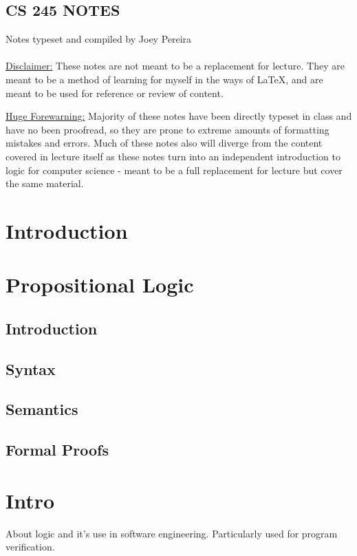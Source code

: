 \documentclass[12pt,oneside,fleqn]{article}
\theoremstyle{definition}
\begin{document}
\thispagestyle{empty}
\subsection*{CS 245 NOTES}
Notes typeset and compiled by Joey Pereira \\
\vspace{1in}
\\
\underline{Disclaimer:}
These notes are not meant to be a replacement for lecture. They are meant to be a method of learning for myself in the ways of \LaTeX, and are meant to be used for reference or review of content.

\underline{Huge Forewarning:}
Majority of these notes have been directly typeset in class and have no been proofread, so they are prone to extreme amounts of formatting mistakes and errors. Much of these notes also will diverge from the content covered in lecture itself as these notes turn into an independent introduction to logic for computer science - meant to be a full replacement for lecture but cover the same material.

\newpage

\noindent
\tableofcontents
\thispagestyle{empty}
\clearpage
\newpage

\setcounter{page}{1}
\section{Introduction}
\section{Propositional Logic}
\subsection{Introduction}
\subsection{Syntax}
\subsection{Semantics}
\subsection{Formal Proofs}

\section{Intro}
About logic and it's use in software engineering. Particularly used for program verification.
\end{document}
